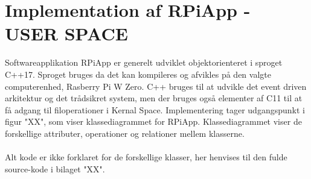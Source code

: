 \documentclass[Softwaredesign/Softwaredesign_main.tex]{subfiles}
\begin{document}
\section{Implementation af RPiApp - USER SPACE}
Softwareapplikation RPiApp er generelt udviklet objektorienteret i sproget C++17. Sproget bruges da det kan kompileres og afvikles på den valgte computerenhed, Rasberry Pi W Zero. C++ bruges til at udvikle det event driven arkitektur og det trådsikret system, men der bruges også elementer af C11 til at få adgang til filoperationer i Kernal Space. Implementering tager udgangspunkt i figur "XX", som viser klassediagrammet for RPiApp. Klassediagrammet viser de forskellige attributer, operationer og relationer mellem klasserne. \\\\
Alt kode er ikke forklaret for de forskellige klasser, her henvises til den fulde source-kode i bilaget "XX". 
\end{document}
